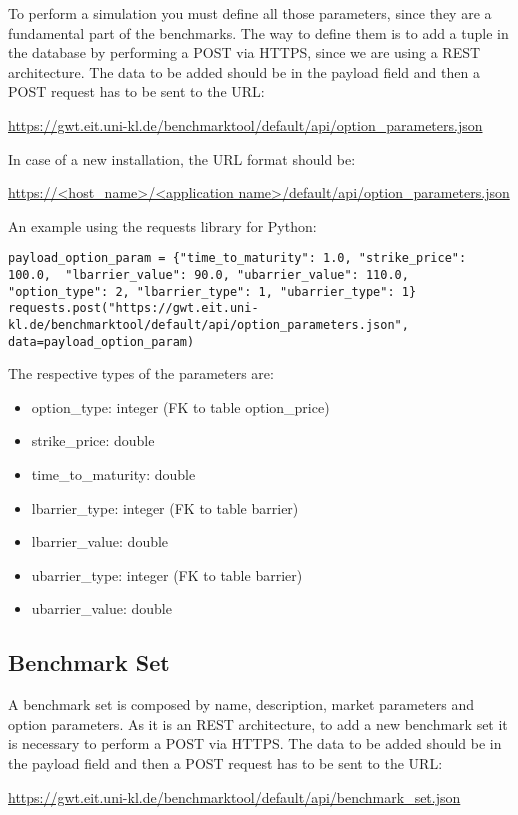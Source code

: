 \documentclass[11pt,a4paper]{article}
\begin{document}
To perform a simulation you must define all those parameters, since they are a fundamental part of the benchmarks.
The way to define them is to add a tuple in the database by performing a POST via HTTPS, since we are using a REST architecture.
The data to be added should be in the payload field and then a POST request has to be sent to the URL: 

\noindent\url{https://gwt.eit.uni-kl.de/benchmarktool/default/api/option_parameters.json}

In case of a new installation, the URL format should be:

\noindent\url{https://<host_name>/<application name>/default/api/option_parameters.json}

An example using the requests library for Python:
\begin{lstlisting}
payload_option_param = {"time_to_maturity": 1.0, "strike_price": 100.0,  "lbarrier_value": 90.0, "ubarrier_value": 110.0, "option_type": 2, "lbarrier_type": 1, "ubarrier_type": 1}
requests.post("https://gwt.eit.uni-kl.de/benchmarktool/default/api/option_parameters.json", data=payload_option_param)
\end{lstlisting}


The respective types of the parameters are:
\begin{itemize}
	\item option\_type: integer (FK to table option\_price)
	\item strike\_price: double
	\item time\_to\_maturity: double
	\item lbarrier\_type: integer (FK to table barrier)
	\item lbarrier\_value: double
	\item ubarrier\_type: integer (FK to table barrier)
	\item ubarrier\_value: double
\end{itemize}

\subsection{Benchmark Set}
A benchmark set is composed by name, description, market parameters and option parameters. 
As it is an REST architecture, to add a new benchmark set it is necessary to perform a POST  via HTTPS.
The data to be added should be in the payload field and then a POST request has to be sent to the URL: 

\noindent\url{https://gwt.eit.uni-kl.de/benchmarktool/default/api/benchmark_set.json}
\end{document}
